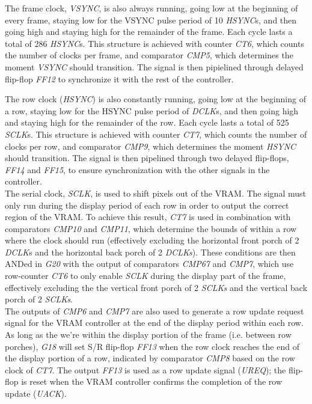 \documentclass[titlepage]{scrartcl}
\begin{document}
	The frame clock, \textit{VSYNC}, is also always running, going low at the beginning of every frame, staying low for the VSYNC pulse period of 10 \textit{HSYNC}s, and then going high and staying high for the remainder of the frame. Each cycle lasts a total of 286 \textit{HSYNC}s. This structure is achieved with counter \textit{CT6}, which counts the number of clocks per frame, and comparator \textit{CMP5}, which determines the moment \textit{VSYNC} should transition. The signal is then pipielined through delayed flip-flop \textit{FF12} to synchronize it with the rest of the controller.

	The row clock (\textit{HSYNC}) is also constantly running, going low at the beginning of a row, staying low for the HSYNC pulse period of \textit{DCLK}s, and then going high and staying high for the remainder of the row. Each cycle lasts a total of 525 \textit{SCLK}s. This structure is achieved with counter \textit{CT7}, which counts the number of clocks per row, and comparator \textit{CMP9}, which determines the moment \textit{HSYNC} should transition. The signal is then pipelined through two delayed flip-flops, \textit{FF14} and \textit{FF15}, to ensure synchronization with the other signals in the controller.\\
	
	The serial clock, \textit{SCLK}, is used to shift pixels out of the VRAM. The signal must only run during the display period of each row in order to output the correct region of the VRAM. To achieve this result, \textit{CT7} is used in combination with comparators \textit{CMP10} and \textit{CMP11}, which determine the bounds of within a row where the clock should run (effectively excluding the horizontal front porch of 2 \textit{DCLK}s and the horizontal back porch of 2 \textit{DCLKs}). These conditions are then ANDed in \textit{G20} with the output of comparators \textit{CMP67} and \textit{CMP7}, which use row-counter \textit{CT6} to only enable \textit{SCLK} during the display part of the frame, effectively excluding the the vertical front porch of 2 \textit{SCLKs} and the vertical back porch of 2 \textit{SCLKs}.\\

	The outputs of \textit{CMP6} and \textit{CMP7} are also used to generate a row update request signal for the VRAM controller at the end of the display period within each row. As long as the we're within the display portion of the frame (i.e. between row porches), \textit{G18} will set S/R flip-flop \textit{FF13} when the row clock reaches the end of the display portion of a row, indicated by comparator \textit{CMP8} based on the row clock of \textit{CT7}. The output \textit{FF13} is used as a row update signal (\textit{UREQ}); the flip-flop is reset when the VRAM controller confirms the completion of the row update (\textit{UACK}).
\end{document}
